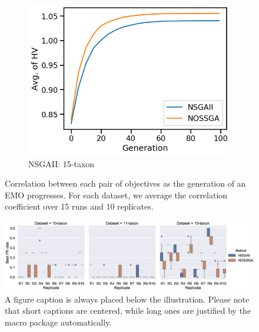 \begin{figure}[!htbp]
\begin{adjustwidth}{-1cm}{-1cm}
\begin{subfigure}[b]{0.4\textwidth}
			\includegraphics[width=\textwidth]{Figure/15-taxon_hv}
			\caption{NSGAII: 15-taxon}
		\end{subfigure}
		\caption{Correlation between each pair of objectives as the generation of an EMO progresses. For each dataset, we average the correlation coefficient over 15 runs and 10 replicates.}
		\label{fig:gen_wise_correlation}
	\end{adjustwidth}
\end{figure}

\begin{figure}
	\centering
	\begin{adjustwidth}{-2cm}{-2cm}
		\includegraphics[width=1.5\textwidth]{Figure/emo_boxplot}
		\caption{A figure caption is always placed below the illustration.
			Please note that short captions are centered, while long ones are
			justified by the macro package automatically.} \label{fig1}
	\end{adjustwidth}
\end{figure}

